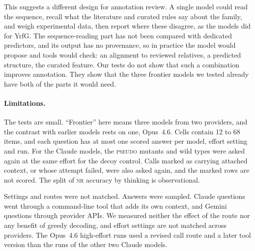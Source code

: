 \documentclass[11pt]{article}
\newcommand{\tnr}{\textmd{\textsc{nr}}}\newcommand{\tfeat}{\textmd{\textsc{feat}}}
\newcommand{\tpseudo}{\textmd{\textsc{pseudo}}}\newcommand{\tstrfn}{\textmd{\textsc{strfn}}}
\begin{document}
This suggests a different design for annotation review. A single model could read the sequence, recall
what the literature and curated rules say about the family, and weigh experimental data, then report
where these disagree, as the models did for YrfG. The sequence-reading part has not been compared with
dedicated predictors, and its output has no provenance, so in practice the model would propose and
tools would check: an alignment to reviewed relatives, a predicted structure, the curated feature. Our
tests do not show that such a combination improves annotation. They show that the three frontier
models we tested already have both of the parts it would need.

\paragraph{Limitations.} The tests are small. ``Frontier'' here means three models from two providers, and
the contrast with earlier models rests on one, Opus~4.6. Cells contain 12 to 68 items, and each question has at most
one scored answer per model, effort setting and run. For the Claude models, the \tpseudo{} mutants and wild types were asked again at the same effort for
the decoy control. Calls marked as carrying attached context, or whose attempt failed, were also asked
again, and the marked rows are not scored. The split of \tnr{} accuracy by thinking is observational.

Settings and routes were not matched. Answers were sampled. Claude questions went through a command-line
tool that adds its own context, and Gemini questions through provider APIs. We measured neither the
effect of the route nor any benefit of greedy decoding, and effort settings are not matched across
providers. The Opus~4.6 high-effort runs used a revised call route and a later tool version than the runs
of the other two Claude models.
\end{document}

